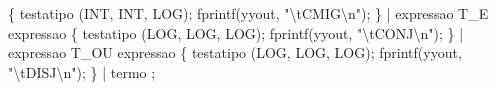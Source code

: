 \documentclass[
  brazilian,
  letterpaper,
]{book}
\newenvironment{Shaded}{\begin{snugshade}}{\end{snugshade}}
\newcommand{\NormalTok}[1]{\textcolor[rgb]{0.00,0.23,0.31}{#1}}
\newcommand{\OperatorTok}[1]{\textcolor[rgb]{0.37,0.37,0.37}{#1}}
\newcommand{\SpecialCharTok}[1]{\textcolor[rgb]{0.37,0.37,0.37}{#1}}
\newcommand{\StringTok}[1]{\textcolor[rgb]{0.13,0.47,0.30}{#1}}
\theoremstyle{plain}
\theoremstyle{definition}
\theoremstyle{remark}
\begin{document}
\begin{Shaded}
\begin{Highlighting}[]
        \OperatorTok{\{}\NormalTok{ testatipo }\OperatorTok{(}\NormalTok{INT}\OperatorTok{,}\NormalTok{ INT}\OperatorTok{,}\NormalTok{ LOG}\OperatorTok{);}\NormalTok{ fprintf}\OperatorTok{(}\NormalTok{yyout}\OperatorTok{,} \StringTok{"}\SpecialCharTok{\textbackslash{}t}\StringTok{CMIG}\SpecialCharTok{\textbackslash{}n}\StringTok{"}\OperatorTok{);} \OperatorTok{\}}
    \OperatorTok{|}\NormalTok{ expressao T\_E expressao}
        \OperatorTok{\{}\NormalTok{ testatipo }\OperatorTok{(}\NormalTok{LOG}\OperatorTok{,}\NormalTok{ LOG}\OperatorTok{,}\NormalTok{ LOG}\OperatorTok{);}\NormalTok{ fprintf}\OperatorTok{(}\NormalTok{yyout}\OperatorTok{,} \StringTok{"}\SpecialCharTok{\textbackslash{}t}\StringTok{CONJ}\SpecialCharTok{\textbackslash{}n}\StringTok{"}\OperatorTok{);} \OperatorTok{\}}
    \OperatorTok{|}\NormalTok{ expressao T\_OU expressao}
        \OperatorTok{\{}\NormalTok{ testatipo }\OperatorTok{(}\NormalTok{LOG}\OperatorTok{,}\NormalTok{ LOG}\OperatorTok{,}\NormalTok{ LOG}\OperatorTok{);}\NormalTok{ fprintf}\OperatorTok{(}\NormalTok{yyout}\OperatorTok{,} \StringTok{"}\SpecialCharTok{\textbackslash{}t}\StringTok{DISJ}\SpecialCharTok{\textbackslash{}n}\StringTok{"}\OperatorTok{);} \OperatorTok{\}}
    \OperatorTok{|}\NormalTok{ termo}
    \OperatorTok{;}


\end{Highlighting}
\end{Shaded}
\end{document}
